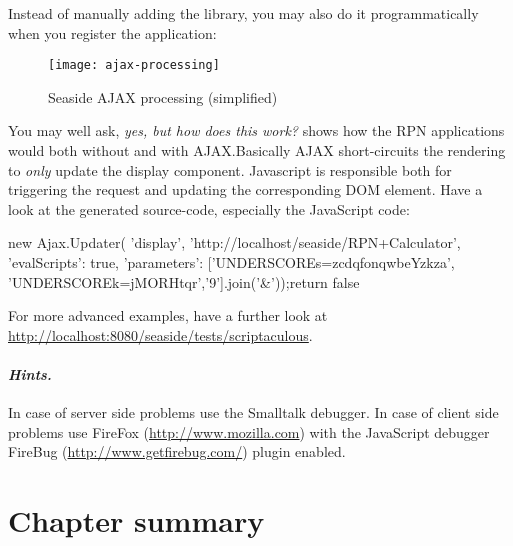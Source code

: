\documentclass[a4paper,10pt,twoside]{book}
\begin{document}

Instead of manually adding the library, you may also do it programmatically when you
register the application:
\begin{code}{}
MyCalculator class>>>initialize
	(self registerAsApplication: 'rpn')
		addLibrary: SULibrary}}
\end{code}

\begin{figure}[ht]
\begin{center}
\texttt{[image: ajax-processing]}
\caption{Seaside AJAX processing (simplified)}
\end{center}
\end{figure}


You may well ask, \emph{yes, but how does this work?}
 shows how the RPN applications would both without and with
AJAX.Basically AJAX short-circuits the rendering to \emph{only} update the display
component.
Javascript is responsible both for triggering the request and updating the corresponding
DOM element.
Have a look at the generated source-code, especially the JavaScript code:

\begin{code}{}
new Ajax.Updater(
	'display',
	'http://localhost/seaside/RPN+Calculator',
	{'evalScripts': true,
'parameters': ['UNDERSCOREs=zcdqfonqwbeYzkza',
'UNDERSCOREk=jMORHtqr','9'].join('&')});return false
\end{code}

For more advanced examples, have a further look at
\url{http://localhost:8080/seaside/tests/scriptaculous}.

\paragraph{\emph{Hints.}}
In case of server side problems use the Smalltalk debugger.
In case of client side problems use FireFox (\url{http://www.mozilla.com}) with the
JavaScript debugger FireBug (\url{http://www.getfirebug.com/}) plugin enabled.

\section{Chapter summary}
\end{document}
